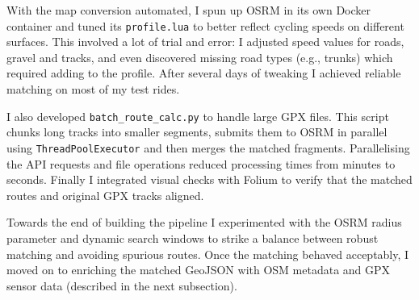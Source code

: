 \documentclass[11pt,a4paper]{report}
\begin{document}
With the map conversion automated, I spun up OSRM in its own Docker container and tuned its \texttt{profile.lua} to better reflect cycling speeds on different surfaces. This involved a lot of trial and error: I adjusted speed values for roads, gravel and tracks, and even discovered missing road types (e.g., trunks) which required adding to the profile. After several days of tweaking I achieved reliable matching on most of my test rides.

I also developed \texttt{batch\_route\_calc.py} to handle large GPX files. This script chunks long tracks into smaller segments, submits them to OSRM in parallel using \texttt{ThreadPoolExecutor} and then merges the matched fragments. Parallelising the API requests and file operations reduced processing times from minutes to seconds. Finally I integrated visual checks with Folium to verify that the matched routes and original GPX tracks aligned.

Towards the end of building the pipeline I experimented with the OSRM radius parameter and dynamic search windows to strike a balance between robust matching and avoiding spurious routes. Once the matching behaved acceptably, I moved on to enriching the matched GeoJSON with OSM metadata and GPX sensor data (described in the next subsection).

\end{document}
